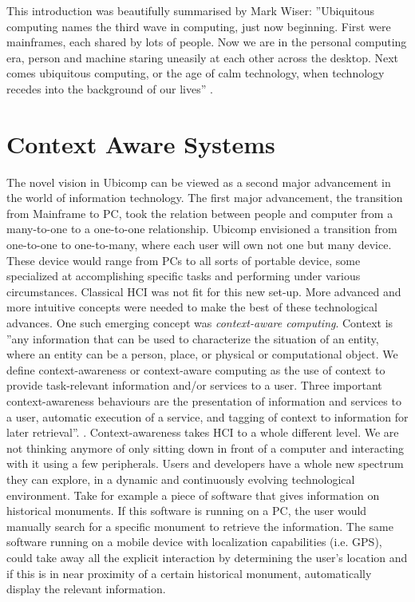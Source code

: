 This introduction was beautifully summarised by Mark Wiser: ''Ubiquitous computing names the third wave in computing, just now beginning. First were mainframes, each shared by lots of people. Now we are in the personal computing era, person and machine staring uneasily at each other across the desktop. Next comes ubiquitous computing, or the age of calm technology, when technology recedes into the background of our lives'' \cite{wiser_bio:online}.

\section{Context Aware Systems}
The novel vision in Ubicomp can be viewed as a second major advancement in the world of information technology. The first major advancement, the transition from Mainframe to PC, took the relation between people and computer from a many-to-one to a one-to-one relationship. Ubicomp envisioned a transition from one-to-one to one-to-many, where each user will own not one but many device. These device would range from PCs to all sorts of portable device, some specialized at accomplishing specific tasks and performing under various circumstances. Classical HCI was not fit for this new set-up. More advanced and more intuitive concepts were needed to make the best of these technological advances. One such emerging concept was \emph{context-aware computing}. Context is ''any information that can be used to characterize the situation of an entity, where an entity can be a person, place, or physical or computational object. We define context-awareness or context-aware computing as the use of context to provide task-relevant information and/or services to a user. Three important context-awareness behaviours are the presentation of information and services to a user, automatic execution of a service, and tagging of context to information for later retrieval''. \cite{abowd1999towards}. Context-awareness takes HCI to a whole different level. We are not thinking anymore of only sitting down in front of a computer and interacting with it using a few peripherals. Users and developers have a whole new spectrum they can explore, in a dynamic and continuously evolving technological environment. Take for example a piece of software that gives information on historical monuments. If this software is running on a PC, the user would manually search for a specific monument to retrieve the information. The same software running on a mobile device with localization capabilities (i.e. GPS), could take away all the explicit interaction by determining the user's location and if this is in near proximity of a certain historical monument, automatically display the relevant information.\\

